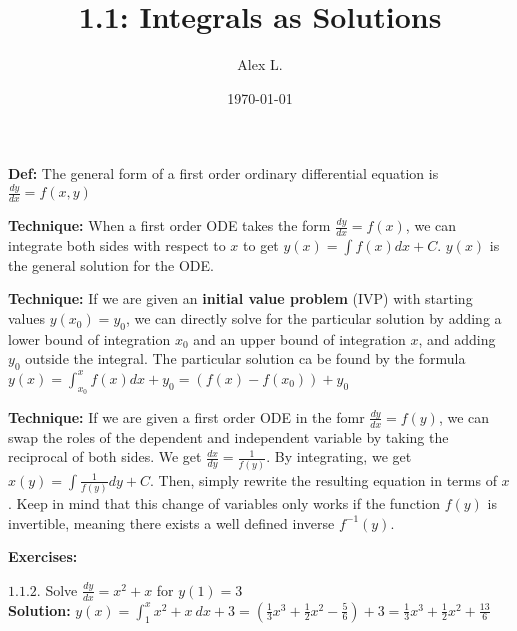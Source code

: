 \documentclass{article}
\title{1.1: Integrals as Solutions}
\author{Alex L.}
\date{\today}
\begin{document}
\maketitle

\textbf{Def:} The general form of a first order ordinary differential equation is $\frac{dy}{dx} = f(x,y)$

\textbf{Technique:} When a first order ODE takes the form $\frac{dy}{dx} = f(x)$, we can integrate both sides with respect to $x$ to get $y(x) = \int{f(x) dx} + C$. $y(x)$ is the general solution for the ODE.

\textbf{Technique:} If we are given an \textbf{initial value problem} (IVP) with starting values $y(x_0) = y_0$, we can directly solve for the particular solution by adding a lower bound of integration $x_0$ and an upper bound of integration $x$, and adding $y_0$ outside the integral. The particular solution ca be found by the formula $y(x) = \int_{x_0}^{x} f(x) dx + y_0 = (f(x) - f(x_0)) + y_0$

\textbf{Technique:} If we are given a first order ODE in the fomr $\frac{dy}{dx} = f(y)$, we can swap the roles of the dependent and independent variable by taking the reciprocal of both sides. We get $\frac{dx}{dy} = \frac{1}{f(y)}$. By integrating, we get $x(y) = \int{\frac{1}{f(y)} dy} + C$. Then, simply rewrite the resulting equation in terms of $x$. Keep in mind that this change of variables only works if the function $f(y)$ is invertible, meaning there exists a well defined inverse $f^{-1}(y)$.

\textbf{Exercises:}  

$1.1.2.$    Solve $\frac{dy}{dx} = x^2 + x$ for $y(1) = 3$ \\ \textbf{Solution:} $y(x) = \int_1^x x^2 + x \ dx + 3 = (\frac{1}{3}x^3 + \frac{1}{2}x^2 - \frac{5}{6}) + 3 = \frac{1}{3} x^3 + \frac{1}{2} x^2 + \frac{13}{6}$
\end{document}

